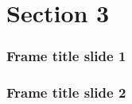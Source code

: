 
\section{Section 3}

\begin{frame}
	\frametitle{Frame title slide 1}
        
 
\end{frame}


\begin{frame}
	\frametitle{Frame title slide 2}
        
 
\end{frame}


